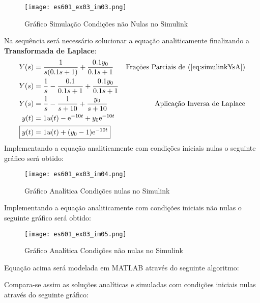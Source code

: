 \documentclass{article}
\begin{document}
\begin{resolution}
\begin{figure}[H]
                        \centering
                        \texttt{[image: es601\_ex03\_im03.png]}
                        \caption{Gráfico Simulação Condições não Nulas no Simulink}
                    \end{figure}
                Na sequência será necessário solucionar a equação analiticamente finalizando a \textbf{Transformada de Laplace}:
                    \begin{align}
                        Y(s) &= \frac{1}{s(0.1s + 1)} + \frac{0.1 y_{0}}{0.1s + 1} & \text{Frações Parciais de (\ref{eq:simulinkYsA})}\nonumber\\
                        Y(s) &= \frac{1}{s} - \frac{0.1}{0.1s + 1} + \frac{0.1y_{0}}{0.1s + 1}\nonumber\\
                        Y(s) &= \frac{1}{s} - \frac{1}{s + 10} + \frac{y_{0}}{s + 10} & \text{Aplicação Inversa de Laplace}\nonumber\\
                        y(t)         &= 1u(t) - \text{e}^{-10t} + y_{0}\text{e}^{-10t}\nonumber\\
                        \Aboxed{y(t) &= 1u(t) + (y_{0} - 1)\text{e}^{-10t}}
                    \end{align}
                Implementando a equação analiticamente com condições iniciais nulas o seguinte gráfico será obtido:
                    \begin{figure}[H]
                        \centering
                        \texttt{[image: es601\_ex03\_im04.png]}
                        \caption{Gráfico Analítica Condições nulas no Simulink}
                    \end{figure}
                Implementando a equação analiticamente com condições iniciais não nulas o seguinte gráfico será obtido:
                    \begin{figure}[H]
                        \centering
                        \texttt{[image: es601\_ex03\_im05.png]}
                        \caption{Gráfico Analítica Condições não nulas no Simulink}
                    \end{figure}
\newpage
                Equação acima será modelada em MATLAB através do seguinte algoritmo:
                    \begin{scriptsize}
                        \myOctave
                        
                    \end{scriptsize}
                Compara-se assim as soluções analíticas e simuladas com condições iniciais nulas através do seguinte gráfico:

\end{resolution}
\end{document}
